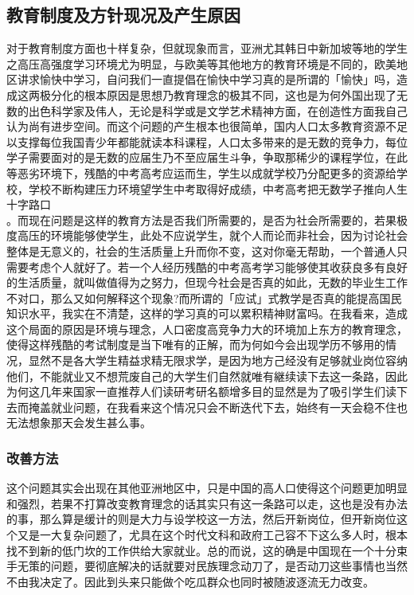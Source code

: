 \documentclass[supercite]{Experimental_Report}
\theoremstyle{definition}
\begin{document}
		\subsection{教育制度及方针现况及产生原因}
		对于教育制度方面也十样复杂，但就现象而言，亚洲尤其韩日中新加坡等地的学生之高压高强度学习环境尤为明显，与欧美等其他地方的教育环境是不同的，欧美地区讲求愉快中学习，自问我们一直提倡在愉快中学习真的是所谓的「愉快」吗，造成这两极分化的根本原因是思想乃教育理念的极其不同，这也是为何外国出现了无数的出色科学家及伟人，无论是科学或是文学艺术精神方面，在创造性方面我自己认为尚有进步空间。而这个问题的产生根本也很简单，国内人口太多教育资源不足以支撑每位我国青少年都能就读本科课程，人口太多带来的是无数的竞争力，每位学子需要面对的是无数的应届生乃不至应届生斗争，争取那稀少的课程学位，在此等恶劣环境下，残酷的中考高考应运而生，学生以成就学校乃分配更多的资源给学校，学校不断构建压力环境望学生中考取得好成绩，中考高考把无数学子推向人生十字路口\\。而现在问题是这样的教育方法是否我们所需要的，是否为社会所需要的，若果极度高压的环境能够使学生，此处不应说学生，就个人而论而非社会，因为讨论社会整体是无意义的，社会的生活质量上升而你不变，这对你毫无帮助，一个普通人只需要考虑个人就好了。若一个人经历残酷的中考高考学习能够使其收获良多有良好的生活质量，就叫做值得为之努力，但现今社会是否真的如此，无数的毕业生工作不对口，那么又如何解释这个现象?而所谓的「应试」式教学是否真的能提高国民知识水平，我实在不清楚，这样的学习真的可以累积精神财富吗。在我看来，造成这个局面的原因是环境与理念，人口密度高竞争力大的环境加上东方的教育理念，使得这样残酷的考试制度是当下唯有的正解，而为何如今会出现学历不够用的情况，显然不是各大学生精益求精无限求学，是因为地方己经没有足够就业岗位容纳他们，不能就业又不想荒废自己的大学生们自然就唯有継续读下去这一条路，因此为何这几年来国家一直推荐人们读研考研名额增多目的显然是为了吸引学生们读下去而掩盖就业问题，在我看来这个情况只会不断迭代下去，始终有一天会稳不住也无法想象那天会发生甚么事。
		\subsubsection{改善方法}
		这个问题其实会出现在其他亚洲地区中，只是中国的高人口使得这个问题更加明显和强烈，若果不打算改变教育理念的话其实只有这一条路可以走，这也是没有办法的事，那么算是缓计的则是大力与设学校这一方法，然后开新岗位，但开新岗位这个又是一大复杂问题了，尤具在这个时代文科和政府工己容不下这么多人时，根本找不到新的低门坎的工作供给大家就业。总的而说，这的确是中国现在一个十分束手无策的问题，要彻底解决的话就要对民族理念动刀了，是否动刀这些事情也当然不由我决定了。因此到头来只能做个吃瓜群众也同时被随波逐流无力改变。
		
\end{document}

